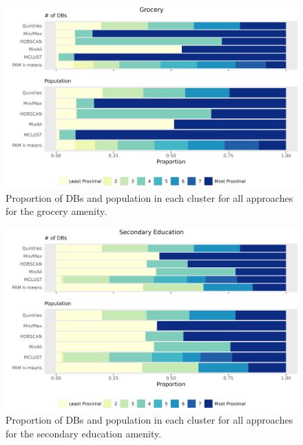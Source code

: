\documentclass[11pt, a4paper]{article}
\begin{document}
\begin{figure}[H]
\centering
\includegraphics[width=\textwidth]{./barplot_comparison/Grocery_barplot.png}
\caption[Grocery profile barplot]{Proportion of DBs and population in each cluster for all approaches for the grocery amenity.}\label{grocerybarplot}
\end{figure}









\begin{figure}[H]
\centering
\includegraphics[width=\textwidth]{./barplot_comparison/Secondary Education_barplot.png}
\caption[Secondary education profile barplot]{Proportion of DBs and population in each cluster for all approaches for the secondary education amenity.}\label{seceducbarplot}
\end{figure}
\end{document}
